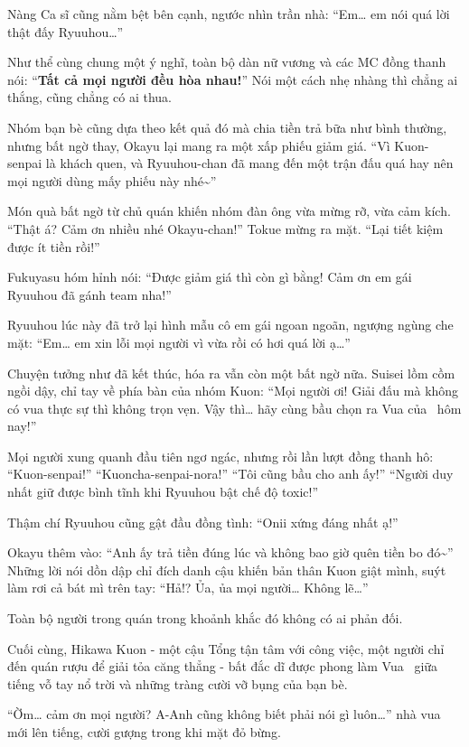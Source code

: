 \documentclass[../main.tex]{subfiles}
\begin{document}
Nàng Ca sĩ cũng nằm bệt bên cạnh, ngước nhìn trần nhà: ``Em\dots{} em nói quá lời thật đấy Ryuuhou\dots''

Như thể cùng chung một ý nghĩ, toàn bộ dàn nữ vương và các MC đồng thanh nói: ``\textbf{Tất cả mọi người đều hòa nhau!}'' Nói một cách nhẹ nhàng thì chẳng ai thắng, cũng chẳng có ai thua.

Nhóm bạn bè cũng dựa theo kết quả đó mà chia tiền trả bữa như bình thường, nhưng bất ngờ thay, Okayu lại mang ra một xấp phiếu giảm giá. ``Vì Kuon-senpai là khách quen, và Ryuuhou-chan đã mang đến một trận đấu quá hay nên mọi người dùng mấy phiếu này nhé\~{}''

Món quà bất ngờ từ chủ quán khiến nhóm đàn ông vừa mừng rỡ, vừa cảm kích. ``Thật á? Cảm ơn nhiều nhé Okayu-chan!'' Tokue mừng ra mặt. ``Lại tiết kiệm được ít tiền rồi!''

Fukuyasu hóm hỉnh nói: ``Được giảm giá thì còn gì bằng! Cảm ơn em gái Ryuuhou đã gánh team nha!''

Ryuuhou lúc này đã trở lại hình mẫu cô em gái ngoan ngoãn, ngượng ngùng che mặt: ``Em\dots{} em xin lỗi mọi người vì vừa rồi có hơi quá lời ạ\dots''

Chuyện tưởng như đã kết thúc, hóa ra vẫn còn một bất ngờ nữa. Suisei lồm cồm ngồi dậy, chỉ tay về phía bàn của nhóm Kuon: ``Mọi người ơi! Giải đấu mà không có vua thực sự thì không trọn vẹn. Vậy thì\dots{} hãy cùng bầu chọn ra Vua của \hll\ hôm nay!''

Mọi người xung quanh đầu tiên ngơ ngác, nhưng rồi lần lượt đồng thanh hô: ``Kuon-senpai!'' ``Kuoncha-senpai-nora!'' ``Tôi cũng bầu cho anh ấy!'' ``Người duy nhất giữ được bình tĩnh khi Ryuuhou bật chế độ toxic!''

Thậm chí Ryuuhou cũng gật đầu đồng tình: ``Onii xứng đáng nhất ạ!''

Okayu thêm vào: ``Anh ấy trả tiền đúng lúc và không bao giờ quên tiền bo đó\~{}'' Những lời nói dồn dập chỉ đích danh cậu khiến bản thân Kuon giật mình, suýt làm rơi cả bát mì trên tay: ``Hả!? Ủa, ủa mọi người\dots{} Không lẽ\dots''

Toàn bộ người trong quán trong khoảnh khắc đó không có ai phản đối.

Cuối cùng, Hikawa Kuon - một cậu Tổng tận tâm với công việc, một người chỉ đến quán rượu để giải tỏa căng thẳng - bất đắc dĩ được phong làm Vua \hll\ giữa tiếng vỗ tay nổ trời và những tràng cười vỡ bụng của bạn bè.

``Ờm\dots{} cảm ơn mọi người? A-Anh cũng không biết phải nói gì luôn\dots'' nhà vua mới lên tiếng, cười gượng trong khi mặt đỏ bừng.
\end{document}
